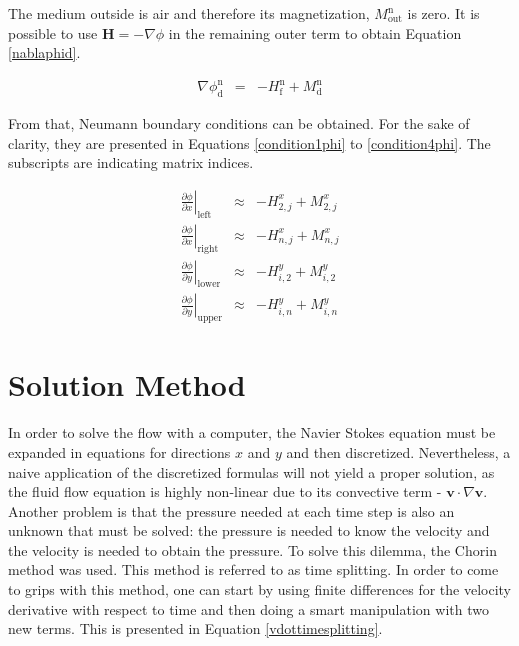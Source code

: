 \documentclass[journal]{IEEEtran}
\begin{document}
The medium outside is air and therefore its magnetization, $M_{\mathrm{out}}^{\mathrm{n}}$ is zero. It is possible to use $\mathbf{H} = -\nabla \phi$ in the remaining outer term to obtain Equation \ref{nablaphid}.

\begin{eqnarray}
\nabla\phi_{\mathrm{d}}^{\mathrm{n}} & = & -H_{\mathrm{f}}^{\mathrm{n}} + M_{\mathrm{d}}^{\mathrm{n}} \label{nablaphid}
\end{eqnarray}

From that, Neumann boundary conditions can be obtained. For the sake of clarity, they are presented in Equations \ref{condition1phi} to \ref{condition4phi}. The subscripts are indicating matrix indices.

\begin{eqnarray}
\left.\frac{\partial \phi}{\partial x}\right|_{\mathrm{left}}\;\;&\approx&- H^{x}_{2,j} + M^{x}_{2,j}\label{condition1phi}\\
\left.\frac{\partial \phi}{\partial x}\right|_{\mathrm{right}}&\approx&- H^{x}_{n,j} + M^{x}_{n,j}\\
\left.\frac{\partial \phi}{\partial y}\right|_{\mathrm{lower}}&\approx&- H^{y}_{i,2} + M^{y}_{i,2}\\
\left.\frac{\partial \phi}{\partial y}\right|_{\mathrm{upper}}&\approx&- H^{y}_{i,n} + M^{y}_{i,n}\label{condition4phi}
\end{eqnarray}

\section{Solution Method}
In order to solve the flow with a computer, the Navier Stokes equation must be expanded in equations for directions $x$ and $y$ and then discretized. Nevertheless, a naive application of the discretized formulas will not yield a proper solution, as the fluid flow equation is highly non-linear due to its convective term - $\mathbf{v}\cdot \nabla \mathbf{v}$. Another problem is that the pressure needed at each time step is also an unknown that must be solved: the pressure is needed to know the velocity and the velocity is needed to obtain the pressure. To solve this dilemma, the Chorin method \cite{Chorin1997118} was used. This method is referred to as time splitting. In order to come to grips with this method, one can start by using finite differences for the velocity derivative with respect to time and then doing a smart manipulation with two new terms. This is presented in Equation \ref{vdottimesplitting}.
\end{document}

